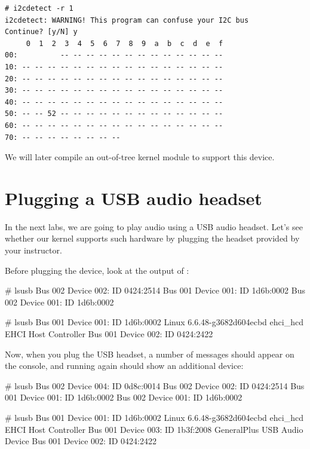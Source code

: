 \begin{verbatim}
# i2cdetect -r 1
i2cdetect: WARNING! This program can confuse your I2C bus
Continue? [y/N] y
     0  1  2  3  4  5  6  7  8  9  a  b  c  d  e  f
00:          -- -- -- -- -- -- -- -- -- -- -- -- --
10: -- -- -- -- -- -- -- -- -- -- -- -- -- -- -- --
20: -- -- -- -- -- -- -- -- -- -- -- -- -- -- -- --
30: -- -- -- -- -- -- -- -- -- -- -- -- -- -- -- --
40: -- -- -- -- -- -- -- -- -- -- -- -- -- -- -- --
50: -- -- 52 -- -- -- -- -- -- -- -- -- -- -- -- --
60: -- -- -- -- -- -- -- -- -- -- -- -- -- -- -- --
70: -- -- -- -- -- -- -- --
\end{verbatim}

We will later compile an out-of-tree kernel module to support this device.

\section{Plugging a USB audio headset}

In the next labs, we are going to play audio using a USB audio headset.
Let's see whether our kernel supports such hardware by plugging the
headset provided by your instructor.

Before plugging the device, look at the output of :

\if{}
\begin{bashinput}
# lsusb
Bus 002 Device 002: ID 0424:2514
Bus 001 Device 001: ID 1d6b:0002
Bus 002 Device 001: ID 1d6b:0002
\end{bashinput}
\fi
\if{}
\begin{bashinput}
# lsusb
Bus 001 Device 001: ID 1d6b:0002 Linux 6.6.48-g3682d604ecbd ehci_hcd EHCI Host Controller
Bus 001 Device 002: ID 0424:2422
\end{bashinput}
\fi

Now, when you plug the USB headset, a number of messages should appear
on the console, and running  again should show an
additional device:

\if{}
\begin{bashinput}
# lsusb
Bus 002 Device 004: ID 0d8c:0014
Bus 002 Device 002: ID 0424:2514
Bus 001 Device 001: ID 1d6b:0002
Bus 002 Device 001: ID 1d6b:0002
\end{bashinput}
\fi
\if{}
\begin{bashinput}
# lsusb
Bus 001 Device 001: ID 1d6b:0002 Linux 6.6.48-g3682d604ecbd ehci_hcd EHCI Host Controller
Bus 001 Device 003: ID 1b3f:2008 GeneralPlus USB Audio Device
Bus 001 Device 002: ID 0424:2422
\end{bashinput}
\fi

